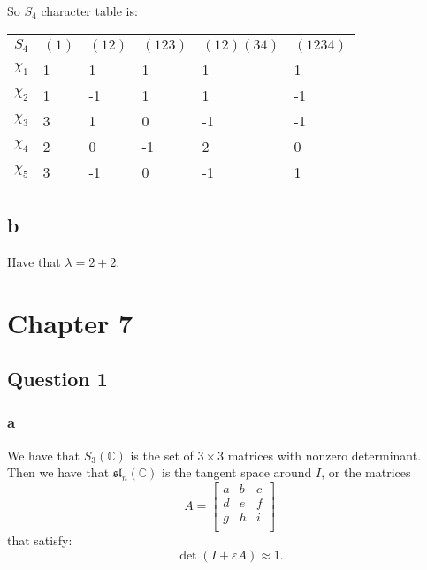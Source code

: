 \documentclass[]{article}
\begin{document}
So $S_4$ character table is:
\begin{table}[h!]
	\centering
	\begin{tabular}{|l|l|l|l|l|l|}
		\hline
		$S_4$    & $(1)$ & $(12)$ & $(123)$ & $(12)(34)$ & $(1234)$ \\ \hline
		$\chi_1$ & 1     & 1      & 1       & 1          & 1        \\ \hline
		$\chi_2$ & 1     & -1     & 1       & 1          & -1       \\ \hline
		$\chi_3$ & 3     & 1      & 0       & -1         & -1       \\ \hline
		$\chi_4$ & 2     & 0      & -1      & 2          & 0        \\ \hline
		$\chi_5$ & 3     & -1     & 0       & -1         & 1        \\ \hline
	\end{tabular}
\end{table}

\subsection*{b}
Have that $\lambda = 2 + 2$. 

\section*{Chapter 7}
\subsection*{Question 1}

\subsubsection*{a}
We have that $S_3(\mathbb{C})$ is the set of $3 \times 3$ matrices with nonzero determinant. 
Then we have that $\mathfrak{sl}_n(\mathbb{C})$ is the tangent space around $I$, or the matrices 
\begin{equation}
	A = 
\begin{bmatrix}
	a & b & c\\
	d & e & f\\
	g & h & i\\
\end{bmatrix}
\end{equation}
 that satisfy:
\begin{equation}
	\det \left(I + \varepsilon A\right) \approx 1.
\end{equation}
\end{document}
